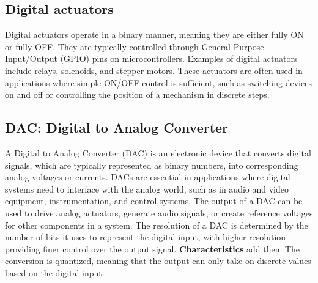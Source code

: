 \subsection{Digital actuators}
Digital actuators operate in a binary manner, meaning they are either fully ON
or fully OFF. They are typically controlled through General Purpose
Input/Output (GPIO) pins on microcontrollers. Examples of digital actuators
include relays, solenoids, and stepper motors. These actuators are often used
in applications where simple ON/OFF control is sufficient, such as switching
devices on and off or controlling the position of a mechanism in discrete
steps.
\subsection{DAC: Digital to Analog Converter}
A Digital to Analog Converter (DAC) is an electronic device that converts
digital signals, which are typically represented as binary numbers, into
corresponding analog voltages or currents. DACs are essential in applications
where digital systems need to interface with the analog world, such as in audio
and video equipment, instrumentation, and control systems. The output of a DAC
can be used to drive analog actuators, generate audio signals, or create
reference voltages for other components in a system. The resolution of a DAC is
determined by the number of bits it uses to represent the digital input, with
higher resolution providing finer control over the output signal. \newline
\textbf{Characteristics} add them The conversion is quantized, meaning that the
output can only take on discrete values based on the digital input.

